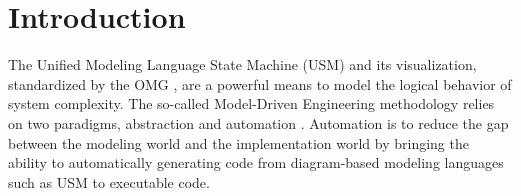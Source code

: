 \section{Introduction}
\label{sec:intro}

The Unified Modeling Language State Machine (USM) \cite{specification_uml_2007} and its visualization, standardized by the OMG \cite{omg}, are a powerful means to model the logical behavior of system complexity.   
The so-called Model-Driven Engineering methodology relies on two paradigms, abstraction and automation \cite{Mussbacher2014}.%
Automation is to reduce the gap between the modeling world
and the implementation world
by bringing the ability to automatically generating code from diagram-based modeling languages such as USM to executable code.  

